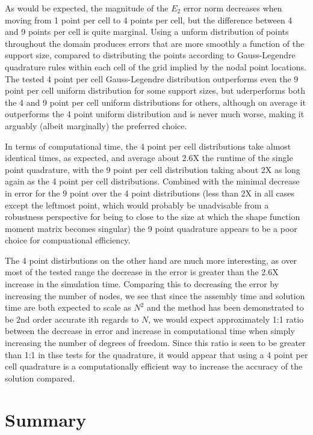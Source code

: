 \documentclass{article}
\begin{document}
As would be expected, the magnitude of the $E_2$ error norm decreases when moving from 1 point per cell to 4 points per cell, but the difference between 4 and 9 points per cell is quite marginal. Using a unform distribution of points throughout the domain produces errors that are more smoothly a function of the support size, compared to distributing the points according to Gauss-Legendre quadrature rules within each cell of the grid implied by the nodal point locations. The tested 4 point per cell Gauss-Legendre distribution outperforms even the 9 point per cell uniform distribution for some support sizes, but uderperforms both the 4 and 9 point per cell uniform distributions for others, although on average it outperforms the 4 point uniform distribution and is never much worse, making it arguably (albeit marginally) the preferred choice.

In terms of computational time, the 4 point per cell distributions take almost identical times, as expected, and average about 2.6X the runtime of the single point quadrature, with the 9 point per cell distribution taking about 2X as long again as the 4 point per cell distributions. Combined with the minimal decrease in error for the 9 point over the 4 point distributions (less than 2X in all cases except the leftmost point, which would probably be unadvisable from a robustness perspective for being to close to the size at which the shape function moment matrix becomes singular) the 9 point quadrature appears to be a poor choice for compuational efficiency.

The 4 point distirbutions on the other hand are much more interesting, as over most of the tested range the decrease in the error is greater than the 2.6X increase in the simulation time. Comparing this to decreasing the error by increasing the number of nodes, we see that since the assembly time and solution time are both expected to scale as $N^2$ and the method has been demonstrated to be 2nd order accurate ith regards to $N$, we would expect approximately 1:1 ratio between the decrease in error and increase in computational time when simply increasing the number of degrees of freedom. Since this ratio is seen to be greater than 1:1 in thse tests for the quadrature, it would appear that using a 4 point per cell quadrature is a computationally efficient way to increase the accuracy of the solution compared.


\section{Summary}
\end{document}
